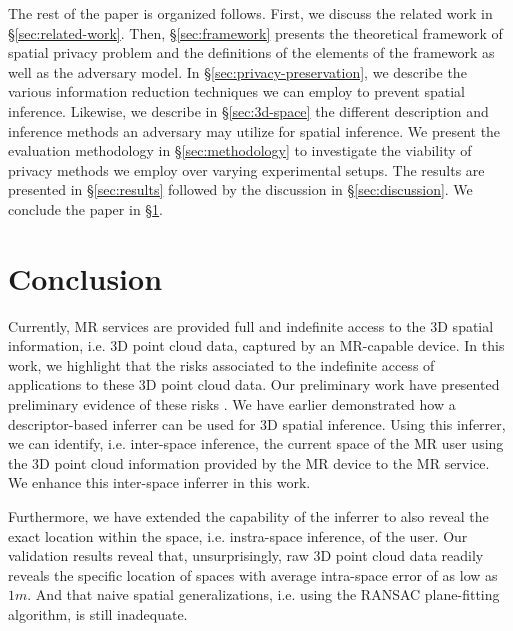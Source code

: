 The rest of the paper is organized follows. First, we discuss the related work in \S\ref{sec:related-work}. Then, \S\ref{sec:framework} presents the theoretical framework of spatial privacy problem and the definitions of the elements of the framework as well as the adversary model. In \S\ref{sec:privacy-preservation}, we describe the various information reduction techniques we can employ to prevent spatial inference. Likewise, we describe in \S\ref{sec:3d-space} the different description and inference methods an adversary may utilize for spatial inference. We present the evaluation methodology in \S\ref{sec:methodology} to investigate the viability of privacy methods we employ over varying experimental setups. The results are presented in \S\ref{sec:results} followed by the discussion in \S\ref{sec:discussion}. We conclude the paper in \S\ref{sec:conclusion}. %

\section{Conclusion}\label{sec:conclusion}
Currently, MR services are provided full and indefinite access to the 3D spatial information, i.e. 3D point cloud data, captured by an MR-capable device. In this work, we highlight that the risks associated to the indefinite access of applications to these 3D point cloud data. Our preliminary work have presented preliminary evidence of these risks \cite{deguzman2019firstlook}. We have earlier demonstrated how a descriptor-based inferrer can be used for 3D spatial inference. Using this inferrer, we can identify, i.e. inter-space inference, the current space of the MR user using the 3D point cloud information provided by the MR device to the MR service. We enhance this inter-space inferrer in this work.

Furthermore, we have extended the capability of the inferrer to also reveal the exact location within the space, i.e. instra-space inference, of the user. Our validation results reveal that, unsurprisingly, raw 3D point cloud data readily reveals the specific location of spaces with average intra-space error of as low as $1 m$. And that naive spatial generalizations, i.e. using the RANSAC plane-fitting algorithm, is still inadequate.%


